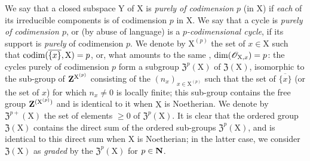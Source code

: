 \begin{env}[21.6.2]
\label{IV.21.6.2}
We say that a closed subspace $\mathrm{Y}$ of $\mathrm{X}$ is \emph{purely of codimension $p$} (in $\mathrm{X}$) if \emph{each} of its irreducible components is of codimension $p$ in $\mathrm{X}$.
We say that a cycle is \emph{purely of codimension $p$}, or (by abuse of language) is a \emph{$p$-codimensional cycle}, if its support is \emph{purely} of codimension $p$.
We denote by $\mathrm{X}^{(p)}$ the set of $x\in\mathrm{X}$ such that $\operatorname{codim}(\overline{\{x\}},\mathrm{X})=p$, or, what amounts to the same ,{} $\dim(\mathscr{O}_{\mathrm{X},x})=p$:
the cycles purely of codimension $p$ form a subgroup $\mathfrak{Z}^p(\mathrm{X})$ of $\mathfrak{Z}(\mathrm{X})$, isomorphic to the sub-group of $\mathbf{Z}^{\mathrm{X}^{(p)}}$ consisting of the $(n_x)_{x\in\mathrm{X}^{(p)}}$ such that the set of $\overline{\{x\}}$ (or the set of $x$) for which $n_x\neq 0$ is locally finite;
this sub-group contains the free group $\mathbf{Z}^{(\mathrm{X}^{(p)})}$ and is identical to it when $\mathrm{X}$ is Noetherian.
We denote by $\mathfrak{Z}^{p+}(\mathrm{X})$ the set of elements $\geq 0$ of $\mathfrak{Z}^p(\mathrm{X})$.
It is clear that the ordered group $\mathfrak{Z}(\mathrm{X})$ contains the direct sum of the ordered sub-groups $\mathfrak{Z}^p(\mathrm{X})$, and is identical to this direct sum when $\mathrm{X}$ is Noetherian;
in the latter case, we consider $\mathfrak{Z}(\mathrm{X})$ as \emph{graded} by the $\mathfrak{Z}^p(\mathrm{X})$ for $p\in\mathbf{N}$.
\end{env}

